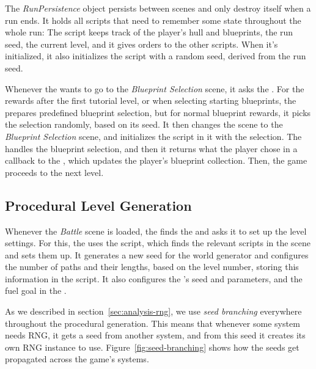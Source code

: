 The \emph{RunPersistence} object persists between scenes and only destroy itself when a run ends.
It holds all scripts that need to remember some state throughout the whole run:
The  script keeps track of the player's hull and blueprints, the run seed, the current level, and it gives orders to the other scripts.
When it's initialized, it also initializes the  script with a random seed, derived from the run seed.

Whenever the  wants to go to the \emph{Blueprint Selection} scene, it asks the .
For the rewards after the first tutorial level, or when selecting starting blueprints, the  prepares predefined blueprint selection, but for normal blueprint rewards, it picks the selection randomly, based on its seed.
It then changes the scene to the \emph{Blueprint Selection} scene, and initializes the  script in it with the selection.
The  handles the blueprint selection, and then it returns what the player chose in a callback to the , which updates the player's blueprint collection.
Then, the game proceeds to the next level.

\subsection{Procedural Level Generation}

Whenever the \emph{Battle} scene is loaded, the  finds the  and asks it to set up the level settings.
For this, the  uses the  script, which finds the relevant scripts in the scene and sets them up.
It generates a new seed for the world generator and configures the number of paths and their lengths, based on the level number, storing this information in the  script.
It also configures the 's seed and parameters, and the fuel goal in the .

As we described in section~\ref{sec:analysis-rng}, we use \emph{seed branching} everywhere throughout the procedural generation.
This means that whenever some system needs RNG, it gets a seed from another system, and from this seed it creates its own RNG instance to use.
Figure~\ref{fig:seed-branching} shows how the seeds get propagated across the game's systems.

